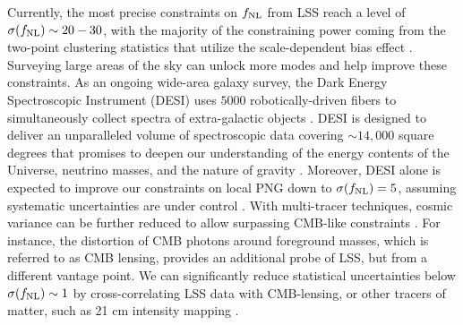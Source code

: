 Currently, the most precise constraints on $f_{\rm NL}$ from LSS reach a level of $\sigma(f_{\rm NL}) \sim 20-30$, with the majority of the constraining power coming from the two-point clustering statistics that utilize the scale-dependent bias effect \citep{2019JCAP...09..010C, mueller2022primordial, 2022PhRvD.106d3506C, 2022arXiv220111518D}. Surveying large areas of the sky can unlock more modes and help improve these constraints. As an ongoing wide-area galaxy survey, the Dark Energy Spectroscopic Instrument (DESI) uses $5000$ robotically-driven fibers to simultaneously collect spectra of extra-galactic objects \citep{2013arXiv1308.0847L, 2016arXiv161100037D, 2023AJ....165....9S}. DESI is designed to deliver an unparalleled volume of spectroscopic data covering $\sim 14,000$ square degrees that promises to deepen our understanding of the energy contents of the Universe, neutrino masses, and the nature of gravity \citep{2022AJ....164..207D}. Moreover, DESI alone is expected to improve our constraints on local PNG down to $\sigma(f_{\rm NL})=5$, assuming systematic uncertainties are under control \citep{aghamousa2016desi}. With multi-tracer techniques, cosmic variance can be further reduced to allow surpassing CMB-like constraints \citep{2015ApJ...814..145A}. For instance, the distortion of CMB photons around foreground masses, which is referred to as CMB lensing, provides an additional probe of LSS, but from a different vantage point. We can significantly reduce statistical uncertainties below $\sigma(f_{\rm NL})\sim 1$ by cross-correlating LSS data with CMB-lensing, or other tracers of matter, such as 21 cm intensity mapping  \citep[see, e.g.,][]{schmittfull2018PhRvD, Heinrich2022AAS...24020203H, 2023arXiv230102406J, 2023arXiv230308901S}.  
 

